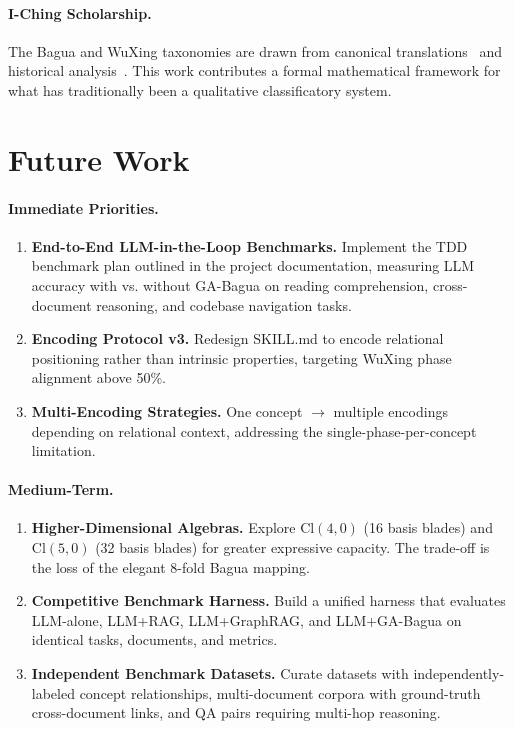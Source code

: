 \documentclass[11pt,a4paper]{article}
\newcommand{\Cl}{\mathrm{Cl}}
\begin{document}
\paragraph{I-Ching Scholarship.} The Bagua and WuXing taxonomies are drawn
from canonical translations~\cite{wilhelm1967iching}
and historical analysis~\cite{smith2012iching,needham1956wuxing}. This work
contributes a formal mathematical framework for what has traditionally been a
qualitative classificatory system.

\section{Future Work}

\paragraph{Immediate Priorities.}
\begin{enumerate}[nosep]
\item \textbf{End-to-End LLM-in-the-Loop Benchmarks.} Implement the TDD
  benchmark plan outlined in the project documentation, measuring LLM accuracy
  with vs. without GA-Bagua on reading comprehension, cross-document
  reasoning, and codebase navigation tasks.
\item \textbf{Encoding Protocol v3.} Redesign SKILL.md to encode relational
  positioning rather than intrinsic properties, targeting WuXing phase
  alignment above 50\%.
\item \textbf{Multi-Encoding Strategies.} One concept $\to$ multiple encodings
  depending on relational context, addressing the single-phase-per-concept
  limitation.
\end{enumerate}

\paragraph{Medium-Term.}
\begin{enumerate}[nosep]
\item \textbf{Higher-Dimensional Algebras.} Explore $\Cl(4,0)$ (16 basis
  blades) and $\Cl(5,0)$ (32 basis blades) for greater expressive capacity.
  The trade-off is the loss of the elegant 8-fold Bagua mapping.
\item \textbf{Competitive Benchmark Harness.} Build a unified harness that
  evaluates LLM-alone, LLM+RAG, LLM+GraphRAG, and LLM+GA-Bagua on identical
  tasks, documents, and metrics.
\item \textbf{Independent Benchmark Datasets.} Curate datasets with
  independently-labeled concept relationships, multi-document corpora with
  ground-truth cross-document links, and QA pairs requiring multi-hop
  reasoning.
\end{enumerate}
\end{document}
